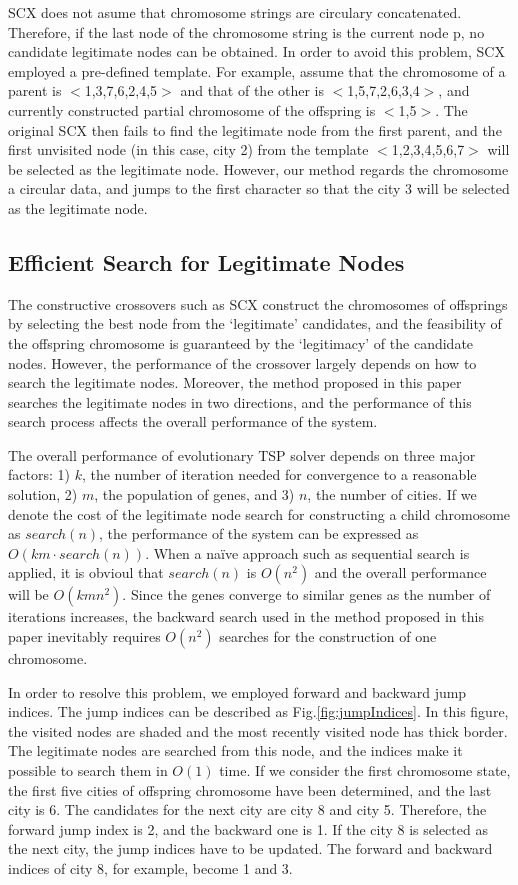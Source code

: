 SCX does not asume that chromosome strings are circulary concatenated. Therefore, if the last node of the chromosome string is the current node p, no candidate legitimate nodes can be obtained. In order to avoid this problem, SCX employed a pre-defined template. 
For example, assume that the chromosome of a parent is $<$1,3,7,6,2,4,5$>$ and that of the other is $<$1,5,7,2,6,3,4$>$, and currently constructed partial chromosome of the offspring is $<$1,5$>$. The original SCX then fails to find the legitimate node from the first parent, and the first unvisited node (in this case, city 2) from the template $<$1,2,3,4,5,6,7$>$ will be selected as the legitimate node. However, our method regards the chromosome a circular data, and jumps to the first character so that the city 3 will be selected as the legitimate node.


\subsection{Efficient Search for Legitimate Nodes}

The constructive crossovers such as SCX construct the chromosomes of offsprings by selecting the best node from the `legitimate' candidates, 
and the feasibility of the offspring chromosome is guaranteed by the `legitimacy' of the candidate nodes. However, the performance of the crossover largely depends on how to search the legitimate nodes.  Moreover, the method proposed in this paper searches the legitimate nodes in two directions, and the performance of this search process affects the overall performance of the system.

The overall performance of evolutionary TSP solver depends on three major factors: 1) $k$, the number of iteration needed for convergence to a reasonable solution, 2) $m$, the population of genes, and 3) $n$, the number of cities. If we denote the cost of the legitimate node search for constructing a child chromosome as $search(n)$, the performance of the system can be expressed as $O(km \cdot search(n))$. When a na{\"i}ve approach such as sequential search is applied, it is obvioul that $search(n)$ is $O(n^2)$ and the overall performance will be $O(kmn^2 )$. 
Since the genes converge to similar genes as the number of iterations increases, the backward search used in the method proposed in this paper inevitably requires $O(n^2)$ searches for the construction of one chromosome.

In order to resolve this problem, we employed forward and backward jump indices. The jump indices can be described as Fig.\ref{fig:jumpIndices}. In this figure, the visited nodes are shaded and the most recently visited node has thick border. The legitimate nodes are searched from this node, and the indices make it possible to search them in $O(1)$ time. 
If we consider the first chromosome state, the first five cities of offspring chromosome have been determined, and the last city is 6.
The candidates for the next city are city 8 and city 5. Therefore, the forward jump index is 2, and the backward one is 1.  
If the city 8 is selected as the next city, the jump indices have to be updated. The forward and backward indices of city 8, for example, become 1 and 3.

